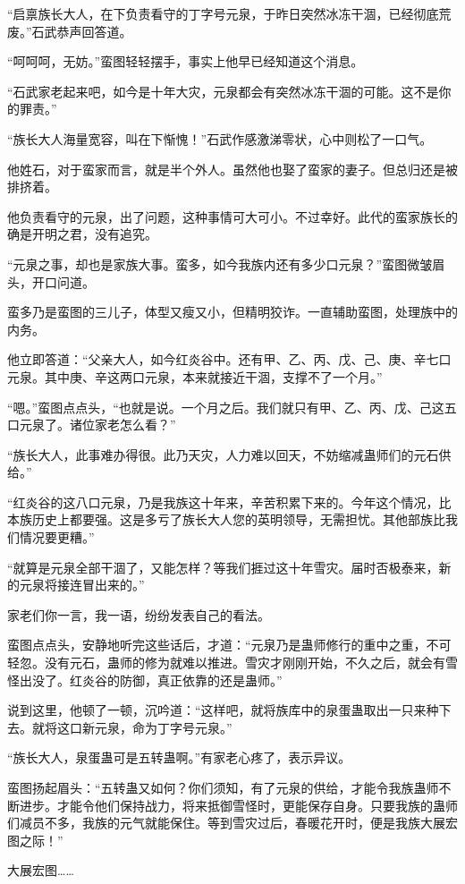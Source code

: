 \begin{this_body}
“启禀族长大人，在下负责看守的丁字号元泉，于昨日突然冰冻干涸，已经彻底荒废。”石武恭声回答道。

“呵呵呵，无妨。”蛮图轻轻摆手，事实上他早已经知道这个消息。

“石武家老起来吧，如今是十年大灾，元泉都会有突然冰冻干涸的可能。这不是你的罪责。”

“族长大人海量宽容，叫在下惭愧！”石武作感激涕零状，心中则松了一口气。

他姓石，对于蛮家而言，就是半个外人。虽然他也娶了蛮家的妻子。但总归还是被排挤着。

他负责看守的元泉，出了问题，这种事情可大可小。不过幸好。此代的蛮家族长的确是开明之君，没有追究。

“元泉之事，却也是家族大事。蛮多，如今我族内还有多少口元泉？”蛮图微皱眉头，开口问道。

蛮多乃是蛮图的三儿子，体型又瘦又小，但精明狡诈。一直辅助蛮图，处理族中的内务。

他立即答道：“父亲大人，如今红炎谷中。还有甲、乙、丙、戊、己、庚、辛七口元泉。其中庚、辛这两口元泉，本来就接近干涸，支撑不了一个月。”

“嗯。”蛮图点点头，“也就是说。一个月之后。我们就只有甲、乙、丙、戊、己这五口元泉了。诸位家老怎么看？”

“族长大人，此事难办得很。此乃天灾，人力难以回天，不妨缩减蛊师们的元石供给。”

“红炎谷的这八口元泉，乃是我族这十年来，辛苦积累下来的。今年这个情况，比本族历史上都要强。这是多亏了族长大人您的英明领导，无需担忧。其他部族比我们情况要更糟。”

“就算是元泉全部干涸了，又能怎样？等我们捱过这十年雪灾。届时否极泰来，新的元泉将接连冒出来的。”

家老们你一言，我一语，纷纷发表自己的看法。

蛮图点点头，安静地听完这些话后，才道：“元泉乃是蛊师修行的重中之重，不可轻忽。没有元石，蛊师的修为就难以推进。雪灾才刚刚开始，不久之后，就会有雪怪出没了。红炎谷的防御，真正依靠的还是蛊师。”

说到这里，他顿了一顿，沉吟道：“这样吧，就将族库中的泉蛋蛊取出一只来种下去。就将这口新元泉，命为丁字号元泉。”

“族长大人，泉蛋蛊可是五转蛊啊。”有家老心疼了，表示异议。

蛮图扬起眉头：“五转蛊又如何？你们须知，有了元泉的供给，才能令我族蛊师不断进步。才能令他们保持战力，将来抵御雪怪时，更能保存自身。只要我族的蛊师们减员不多，我族的元气就能保住。等到雪灾过后，春暖花开时，便是我族大展宏图之际！”

大展宏图……


\end{this_body}
